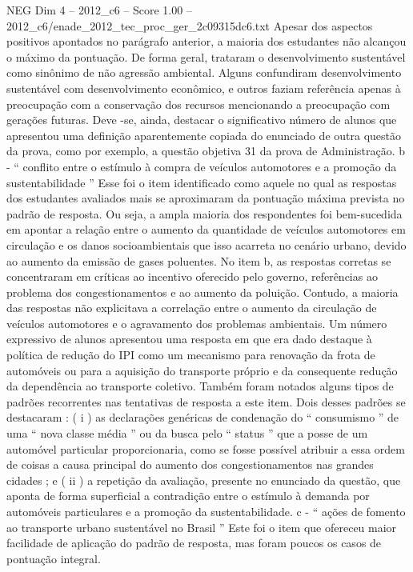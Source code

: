 \begin{textsample}{NEG Dim 4 – 2012\_c6 – Score 1.00 – 2012\_c6/enade\_2012\_tec\_proc\_ger\_2c09315dc6.txt}
Apesar dos aspectos positivos apontados no parágrafo anterior, a maioria dos estudantes não alcançou o máximo da pontuação.
De forma geral, trataram o desenvolvimento sustentável como sinônimo de não agressão ambiental.
Alguns confundiram desenvolvimento sustentável com desenvolvimento econômico, e outros faziam referência apenas à preocupação com a conservação dos recursos mencionando a preocupação com gerações futuras.
Deve -se, ainda, destacar o significativo número de alunos que apresentou uma definição aparentemente copiada do enunciado de outra questão da prova, como por exemplo, a questão objetiva 31 da prova de Administração. b - “ conflito entre o estímulo à compra de veículos automotores e a promoção da sustentabilidade ” Esse foi o item identificado como aquele no qual as respostas dos estudantes avaliados mais se aproximaram da pontuação máxima prevista no padrão de resposta.
Ou seja, a ampla maioria dos respondentes foi bem-sucedida em apontar a relação entre o aumento da quantidade de veículos automotores em circulação e os danos socioambientais que isso acarreta no cenário urbano, devido ao aumento da emissão de gases poluentes.
No item b, as respostas corretas se concentraram em críticas ao incentivo oferecido pelo governo, referências ao problema dos congestionamentos e ao aumento da poluição.
Contudo, a maioria das respostas não explicitava a correlação entre o aumento da circulação de veículos automotores e o agravamento dos problemas ambientais.
Um número expressivo de alunos apresentou uma resposta em que era dado destaque à política de redução do IPI como um mecanismo para renovação da frota de automóveis ou para a aquisição do transporte próprio e da consequente redução da dependência ao transporte coletivo.
Também foram notados alguns tipos de padrões recorrentes nas tentativas de resposta a este item.
Dois desses padrões se destacaram : ( i ) as declarações genéricas de condenação do “ consumismo ” de uma “ nova classe média ” ou da busca pelo “ status ” que a posse de um automóvel particular proporcionaria, como se fosse possível atribuir a essa ordem de coisas a causa principal do aumento dos congestionamentos nas grandes cidades ; e ( ii ) a repetição da avaliação, presente no enunciado da questão, que aponta de forma superficial a contradição entre o estímulo à demanda por automóveis particulares e a promoção da sustentabilidade. c - “ ações de fomento ao transporte urbano sustentável no Brasil ” Este foi o item que ofereceu maior facilidade de aplicação do padrão de resposta, mas foram poucos os casos de pontuação integral.

\end{textsample}
